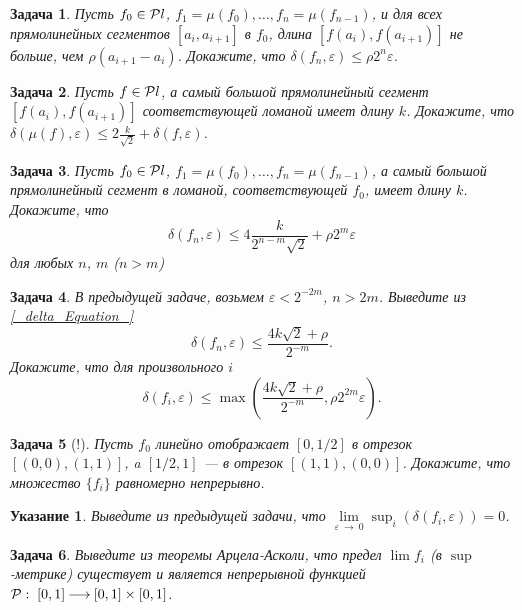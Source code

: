 \documentclass[12pt]{book}
\newcommand{\arrow}{{\:\longrightarrow\:}}
\renewcommand{\epsilon}{\varepsilon}
\theoremstyle{upshape}
\newtheorem{zadacha}{Задача}[chapter]
\theoremstyle{generic}
\theoremstyle{upshapenonumber}
\newtheorem{ukazanie}{Указание}[section]
\newcommand{\следствие}{%
     \refstepcounter{teorema}
     {\noindent\bf Следствие \thechapter.\arabic{teorema}:\ }}
\newcommand{\пример}{%
     \refstepcounter{teorema}
     {\noindent\bf Пример \thechapter.\arabic{teorema}:\ }}
\newcommand{\лемма}{%
     \refstepcounter{teorema}
     {\noindent\bf Лемма \thechapter.\arabic{teorema}:\ }}
\newcommand{\теорема}{%
     \refstepcounter{teorema}
     {\noindent\bf Теорема \thechapter.\arabic{teorema}:\ }}
\newcommand{\утверждение}{%
     \refstepcounter{teorema}
     {\noindent\bf Утверждение \thechapter.\arabic{teorema}:\ }}
\begin{document}
{\begin{zadacha}
Пусть $f_0\in {\cal P}l$, $f_1 = \mu(f_0), \dots, f_n = \mu(f_{n-1})$,
и для всех прямолинейных сегментов
$[a_i, a_{i+1}]$ в $f_0$, длина $[f(a_i), f(a_{i+1})]$
не больше, чем $\rho(a_{i+1}-a_i)$.
Докажите, что $\delta(f_n, \epsilon)\leq \rho 2^n\epsilon$.
\end{zadacha}

\begin{zadacha}
Пусть $f\in {\cal P}l$, а самый большой прямолинейный
сегмент $[f(a_i), f(a_{i+1})]$ соответствующей ломаной
имеет длину $k$. Докажите, что 
$\delta(\mu(f), \epsilon) \leq 2\frac{k}{\sqrt 2}+\delta(f, \epsilon)$.
\end{zadacha}

\begin{zadacha} 
Пусть $f_0\in {\cal P}l$, $f_1 = \mu(f_0), \dots, f_n = \mu(f_{n-1})$,
а самый большой прямолинейный сегмент в ломаной, соответствующей
$f_0$, имеет длину $k$.
Докажите, что 
\begin{equation}\label{_delta_Equation_}
\delta(f_n, \epsilon) \leq 4\frac{k}{2^{n-m}\sqrt 2}+\rho 2^m\epsilon
\end{equation}
для любых $n$, $m$ ($n>m$)
\end{zadacha}

\begin{zadacha}
В предыдущей задаче, возьмем $\epsilon < 2^{-2m}$,
$n > 2m$. Выведите из \eqref{_delta_Equation_} 
\[
\delta(f_n, \epsilon) \leq  \frac{4k\sqrt 2+\rho}{2^{-m}}.
\]
Докажите, что для произвольного $i$
\[
\delta(f_i, \epsilon) \leq  \max \left(\frac{4k\sqrt
2+\rho}{2^{-m}},  \rho 2^{2m}\epsilon\right).
\]
\end{zadacha}

\begin{zadacha}[!]
Пусть $f_0$ линейно отображает $[0, 1/2]$ в отрезок
$[(0,0), (1,1)]$, a $[1/2, 1]$ --- в отрезок $[ (1,1), (0,0)]$.
Докажите, что множество $\{ f_i\}$ равномерно непрерывно.
\end{zadacha}

\begin{ukazanie}
Выведите из предыдущей задачи, что 
$\lim\limits_{\epsilon\arrow 0}\sup_i(\delta(f_i, \epsilon))=0$.
\end{ukazanie}

\begin{zadacha} 
Выведите из теоремы Арцела-Асколи, что
предел $\lim f_i$ (в $\sup$-метрике) существует
и является непрерывной функцией 
${\cal P}:\; [0,1] \arrow [0,1]\times [0,1]$.
\end{zadacha}

}
\end{document}
